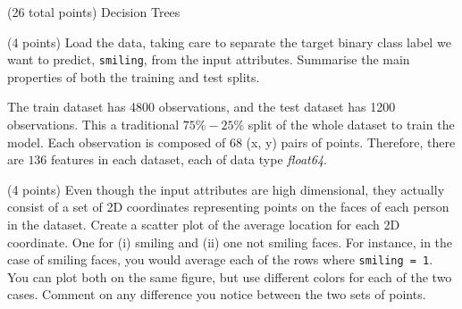 \documentclass[12pt]{article}
\begin{document}
\clearpage


\begin{question}{(26 total points) Decision Trees}





%
%
\begin{subquestion}{(4 points) Load the data, taking care to separate the target binary class label we want to predict, \texttt{smiling}, from the input attributes. 
Summarise the main properties of both the training and test splits. 
}


\begin{answerbox}{12em}
The train dataset has 4800 observations, and the test dataset has 1200 observations. This a traditional $75\%-25\%$ split of the whole dataset to train the model. Each observation is composed of 68 (x, y) pairs of points. Therefore, there are $136$ features in each dataset, each of data type \textit{float64}.
\end{answerbox}



\end{subquestion}


%
%
\begin{subquestion}{(4 points) Even though the input attributes are high dimensional, they actually consist of a set of 2D coordinates representing points on the faces of each person in the dataset. 
Create a scatter plot of the average location for each 2D coordinate. One for (i) smiling and (ii) one not smiling faces. 
For instance, in the case of smiling faces, you would average each of the rows where \texttt{smiling = 1}. 
You can plot both on the same figure, but use different colors for each of the two cases. 
Comment on any difference you notice between the two sets of points. \\
}



\end{subquestion}
\end{question}
\end{document}
